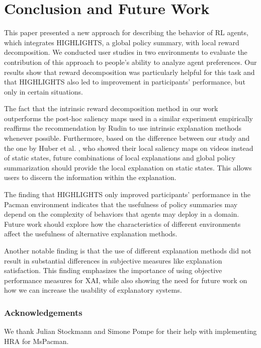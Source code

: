 \documentclass[runningheads]{llncs}
\begin{document}
\section{Conclusion and Future Work}
This paper presented a new approach for describing the behavior of RL agents, which integrates HIGHLIGHTS, a global policy summary, with local reward decomposition. We conducted user studies in two environments to evaluate the contribution of this approach to people's ability to analyze agent preferences. Our results show that reward decomposition was particularly helpful for this task and that HIGHLIGHTS also led to improvement in participants' performance, but only in certain situations. 

The fact that the intrinsic reward decomposition method in our work outperforms the post-hoc saliency maps used in a similar experiment \cite{huber2020local} empirically reaffirms the recommendation by Rudin \cite{rudin19} to use intrinsic explanation methods whenever possible.
Furthermore, based on the difference between our study and the one by Huber et al. \cite{huber2020local}, who showed their local saliency maps on videos instead of static states, future combinations of local explanations and global policy summarization should provide the local explanation on static states.
This allows users to discern the information within the explanation. 

The finding that HIGHLIGHTS only improved participants' performance in the Pacman environment indicates that the usefulness of policy summaries may depend on the complexity of behaviors that agents may deploy in a domain.
Future work should explore how the characteristics of different environments affect the usefulness of alternative explanation methods.

Another notable finding is that the use of different explanation methods did not result in substantial differences in subjective measures like explanation satisfaction. This finding emphasizes the importance of using objective performance measures for XAI, while also showing the need for future work on how we can increase the usability of explanatory systems.


\subsubsection{Acknowledgements} 
 We thank Julian Stockmann and Simone Pompe for their help with implementing HRA for MsPacman.

%
%
%


%
\end{document}
